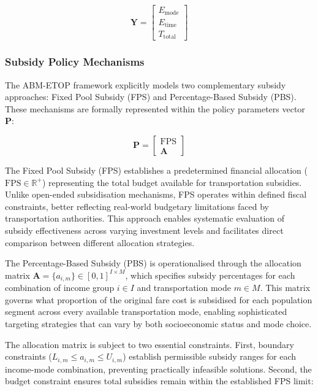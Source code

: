 \documentclass[a4paper,fleqn]{cas-sc}
\begin{document}
\begin{equation}
\mathbf{Y} = \begin{bmatrix} E_{\text{mode}} \\ E_{\text{time}} \\ T_{\text{total}} \end{bmatrix}
\end{equation}
\subsubsection{Subsidy Policy Mechanisms}
The ABM-ETOP framework explicitly models two complementary subsidy approaches: Fixed Pool Subsidy (FPS) and Percentage-Based Subsidy (PBS). These mechanisms are formally represented within the policy parameters vector $\mathbf{P}$:

\begin{equation}
\mathbf{P} = \begin{bmatrix} \text{FPS} \\ \mathbf{A} \end{bmatrix}
\end{equation}

The Fixed Pool Subsidy (FPS) establishes a predetermined financial allocation ($\text{FPS} \in \mathbb{R}^+$) representing the total budget available for transportation subsidies. Unlike open-ended subsidisation mechanisms, FPS operates within defined fiscal constraints, better reflecting real-world budgetary limitations faced by transportation authorities. This approach enables systematic evaluation of subsidy effectiveness across varying investment levels and facilitates direct comparison between different allocation strategies.

The Percentage-Based Subsidy (PBS) is operationalised through the allocation matrix $\mathbf{A} = \{a_{i,m}\} \in [0,1]^{I \times M}$, which specifies subsidy percentages for each combination of income group $i \in I$ and transportation mode $m \in M$. This matrix governs what proportion of the original fare cost is subsidised for each population segment across every available transportation mode, enabling sophisticated targeting strategies that can vary by both socioeconomic status and mode choice.

The allocation matrix is subject to two essential constraints. First, boundary constraints ($L_{i,m} \leq a_{i,m} \leq U_{i,m}$) establish permissible subsidy ranges for each income-mode combination, preventing practically infeasible solutions. Second, the budget constraint ensures total subsidies remain within the established FPS limit:
\end{document}

